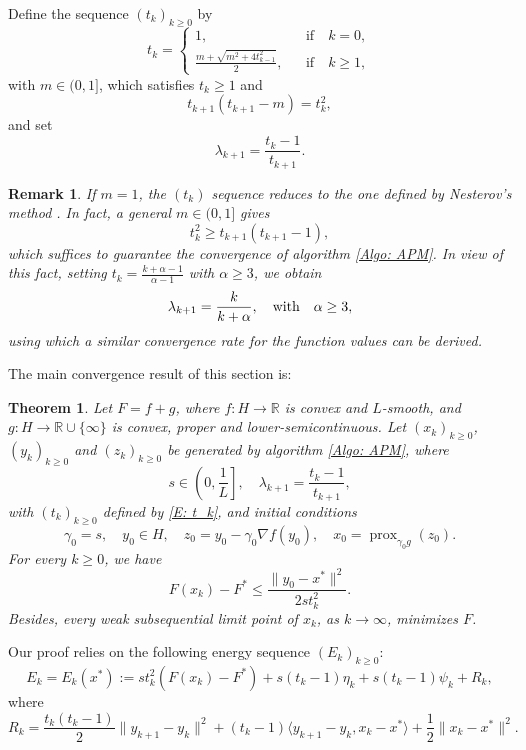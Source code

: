 \documentclass[pdflatex,sn-mathphys-num]{sn-jnl}
\theoremstyle{thmstyleone}
\newtheorem{theorem}{Theorem}
\theoremstyle{thmstyletwo}
\newtheorem{remark}{Remark}
\theoremstyle{thmstylethree}
\DeclareMathOperator{\prox}{prox}
\newcommand{\qbox}[1]{\quad\hbox{#1}\quad}
\begin{document}
Define the sequence $(t_k)_{k\ge 0}$ by 
\begin{equation}\label{E: t_k}
t_k = \left\{
\begin{array}{ccl}
1,&& \text{if}\quad k=0,\\[3pt]
\frac{m+\sqrt{m^2 + 4t_{k-1}^2}}{2},&& \text{if}\quad k\ge 1,
\end{array}    
\right.
\end{equation}
with $m\in(0,1]$, which satisfies $t_k \ge 1$ and
$$ t_{k+1}(t_{k+1}-m) = t_k^2, $$
and set
$$ \lambda_{k+1} = \frac{t_k-1}{t_{k+1}}. $$


\begin{remark}
If $m=1$, the $(t_k)$ sequence reduces to the one defined by Nesterov's method \cite{Nesterov_1983}. In fact, a general $m\in(0,1]$ gives
$$ t_k^2 \ge t_{k+1}(t_{k+1}-1), $$
which suffices to guarantee the convergence of algorithm \eqref{Algo: APM}. In view of this fact, setting $t_k = \frac{k+\alpha-1}{\alpha-1}$ with $\alpha\ge 3$, we obtain 
$$ \lambda_{k+1} = \frac{k}{k+\alpha},\qbox{with}\alpha\ge 3, $$
using which a similar convergence rate for the function values can be derived. 
\end{remark}


The main convergence result of this section is:

\begin{theorem}\label{Thm: rate_cvx}
Let $F=f+g$, where $f:H\to\mathbb{R}$ is convex and $L$-smooth, and $g:H\to\mathbb{R}\cup\{\infty\}$ is convex, proper and lower-semicontinuous. Let $(x_k)_{k\ge 0}$, $(y_k)_{k\ge 0}$ and $(z_k)_{k\ge 0}$ be generated by algorithm \eqref{Algo: APM}, where 
$$ s\in\left( 0,\frac{1}{L} \right],\quad \lambda_{k+1} = \frac{t_k-1}{t_{k+1}}, $$
with $(t_k)_{k\ge 0}$ defined by \eqref{E: t_k}, and initial conditions 
$$ \gamma_0 = s,\quad y_0\in H,\quad z_0=y_0-\gamma_0 \nabla f(y_0),\quad x_0=\prox_{\gamma_0 g}(z_0). $$
For every $k\ge 0$, we have
$$ F(x_k) - F^* \le \frac{\| y_0-x^* \|^2}{2st_k^2}. $$
Besides, every weak subsequential limit point of $x_k$, as $k\to\infty$, minimizes $F$.
\end{theorem}


Our proof relies on the following energy sequence $(E_k)_{k\ge 0}$:
\begin{equation}\label{E: E_k}
E_k = E_k(x^*) 
    := st_k^2 \left( F(x_k) - F^* \right)
      + s(t_k-1) \eta_k
      + s(t_k-1) \psi_k
      + R_k,
\end{equation}
where
$$ R_k = \frac{t_k(t_k-1)}{2} \| y_{k+1} - y_k \|^2
        + (t_k-1)\langle y_{k+1}-y_k, x_k-x^* \rangle 
        + \frac{1}{2} \| x_k-x^* \|^2.$$
\end{document}
